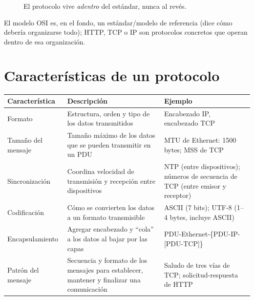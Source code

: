 \documentclass[11pt,a4paper]{article}
\begin{document}
\begin{figure}[h]
\centering
{}
\caption{El protocolo vive \emph{adentro} del estándar, nunca al revés.}
\end{figure}

\begin{examfact}
El modelo OSI es, en el fondo, un estándar/modelo de referencia (dice cómo debería organizarse todo); HTTP, TCP o IP son protocolos concretos que operan dentro de esa organización.
\end{examfact}

\newpage
\section{Características de un protocolo}

\begin{center}
\small
\begin{tabularx}{\textwidth}{@{}l X X@{}}
\toprule
\textbf{Característica} & \textbf{Descripción} & \textbf{Ejemplo} \\
\midrule
Formato & Estructura, orden y tipo de los datos transmitidos & Encabezado IP, encabezado TCP \\
Tamaño del mensaje & Tamaño máximo de los datos que se pueden transmitir en un PDU & MTU de Ethernet: 1500 bytes; MSS de TCP \\
Sincronización & Coordina velocidad de transmisión y recepción entre dispositivos & NTP (entre dispositivos); números de secuencia de TCP (entre emisor y receptor) \\
Codificación & Cómo se convierten los datos a un formato transmisible & ASCII (7 bits); UTF-8 (1--4 bytes, incluye ASCII) \\
Encapsulamiento & Agregar encabezado y ``cola'' a los datos al bajar por las capas & PDU-Ethernet-\{PDU-IP-[PDU-TCP]\} \\
Patrón del mensaje & Secuencia y formato de los mensajes para establecer, mantener y finalizar una comunicación & Saludo de tres vías de TCP; solicitud-respuesta de HTTP \\
\bottomrule
\end{tabularx}
\end{center}
\end{document}

